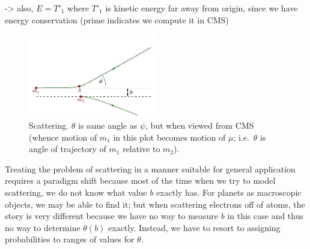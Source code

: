 \documentclass[../class_mech_main.tex]{subfiles}
\begin{document}
-> also, $E = T'_1$ where $T'_1$ is kinetic energy far away from origin, since we have energy conservation (prime indicates we compute it in CMS)




\begin{figure}
	\centering

	\includegraphics[width=0.5\textwidth]{pictures/scattering.pdf}

	\caption{Scattering. $\theta$ is same angle as $\psi$, but when viewed from CMS (whence motion of $m_1$ in this plot becomes motion of $\mu$; i.e.~$\theta$ is angle of trajectory of $m_1$ relative to $m_2$).}
	\label{fig:scattering}
\end{figure}



Treating the problem of scattering in a manner suitable for general application requires a paradigm shift because most of the time when we try to model scattering, we do not know what value $b$ exactly has. For planets as macroscopic objects, we may be able to find it; but when scattering electrons off of atoms, the story is very different because we have no way to measure $b$ in this case and thus no way to determine $\theta(b)$ exactly. Instead, we have to resort to assigning probabilities to ranges of values for $\theta$.

\end{document}
